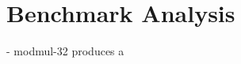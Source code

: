\chapter{Benchmark Analysis}
\label{ch:benchmark_analysis}
- modmul-32 produces a \cite{sc2017-proceedings}

